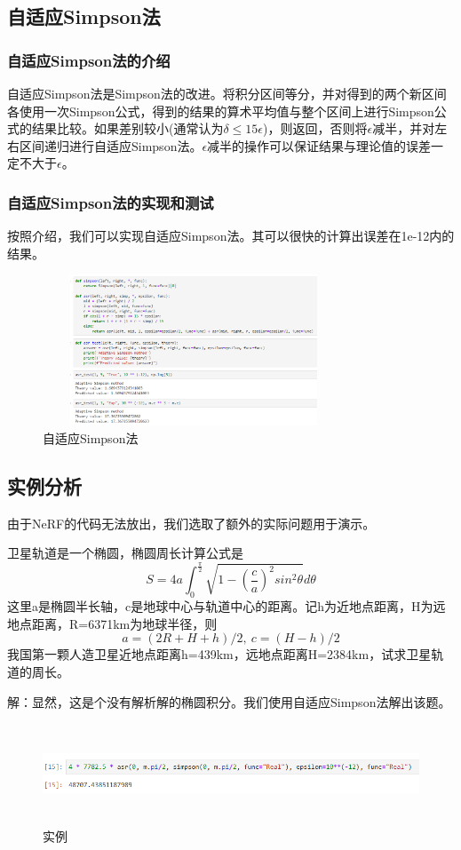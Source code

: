 \documentclass{article}
\begin{document}
	\subsection{自适应Simpson法}	
		\subsubsection{自适应Simpson法的介绍}
自适应Simpson法是Simpson法的改进。将积分区间等分，并对得到的两个新区间各使用一次Simpson公式，得到的结果的算术平均值与整个区间上进行Simpson公式的结果比较。如果差别较小(通常认为$\delta\leq15\epsilon$)，则返回，否则将$\epsilon$减半，并对左右区间递归进行自适应Simpson法。$\epsilon$减半的操作可以保证结果与理论值的误差一定不大于$\epsilon$。

		\subsubsection{自适应Simpson法的实现和测试}
按照介绍，我们可以实现自适应Simpson法。其可以很快的计算出误差在1e-12内的结果。

\begin{figure}[htbp]
	\centering
	\includegraphics[width=9cm, height=4.5cm]{asr.png}
	\caption{自适应Simpson法}
\end{figure}

	\subsection{实例分析}
由于NeRF的代码无法放出，我们选取了额外的实际问题用于演示。

卫星轨道是一个椭圆，椭圆周长计算公式是
$$
S=4a\int_0^{\frac{\pi}{2}}\sqrt{1-(\frac{c}{a})^2sin^2\theta}d\theta
$$
这里a是椭圆半长轴，c是地球中心与轨道中心的距离。记h为近地点距离，H为远地点距离，R=6371km为地球半径，则
$$
a=(2R+H+h)/2,\ c=(H-h)/2
$$
我国第一颗人造卫星近地点距离h=439km，远地点距离H=2384km，试求卫星轨道的周长。

解：显然，这是个没有解析解的椭圆积分。我们使用自适应Simpson法解出该题。
\begin{figure}[htbp]
	\centering
	\includegraphics[width=12cm, height=3cm]{realtest.png}
	\caption{实例}
\end{figure}
\end{document}
